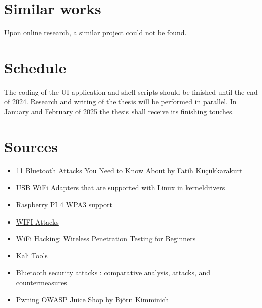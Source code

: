 \documentclass{article}
\begin{document}
\section{Similar works}
Upon online research, a similar project could not be found.



\section{Schedule}

The coding of the UI application and shell scripts should be finished until the end of 2024. Research and writing of the thesis will be performed in parallel. 
In January and February of 2025 the thesis shall receive its finishing touches.


\section{Sources}

\begin{itemize}
    \item \href{https://www.makeuseof.com/bluetooth-attacks/}{11 Bluetooth Attacks You Need to Know About by Fatih Küçükkarakurt}
    \item \href{https://github.com/morrownr/USB-WiFi/blob/main/home/USB_WiFi_Adapters_that_are_supported_with_Linux_in-kernel_drivers.md}{USB WiFi Adapters that are supported with Linux in kerneldrivers}
    \item \href{https://forums.raspberrypi.com/viewtopic.php?t=364824#}{Raspberry PI 4 WPA3 support}
    \item \href{https://www.w3schools.com/cybersecurity/cybersecurity_wifi_attacks.php}{WIFI Attacks}
    \item \href{https://learning.oreilly.com/course/wifi-hacking-wireless/9781789530193/}{WiFi Hacking: Wireless Penetration Testing for Beginners}
    \item \href{https://www.kali.org/tools/}{Kali Tools}
    \item \href{https://link-springer-com.thn.idm.oclc.org/book/10.1007/978-3-642-40646-1}{Bluetooth security attacks : comparative analysis, attacks, and countermeasures}
    \item \href{https://help.owasp-juice.shop/}{Pwning OWASP Juice Shop by Björn Kimminich}
\end{itemize}
\end{document}
